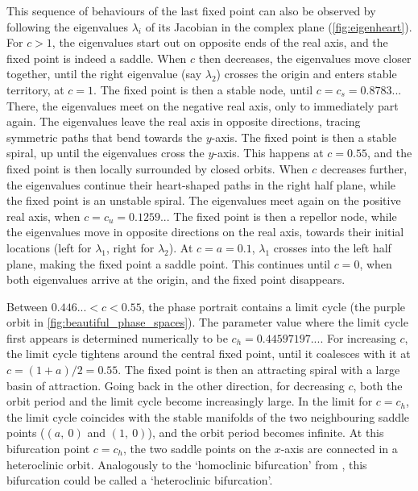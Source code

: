This sequence of behaviours of the last fixed point can also be observed by following the eigenvalues $\lambda_i$ of its Jacobian in the complex plane (\cref{fig:eigenheart}). For $c > 1$, the eigenvalues start out on opposite ends of the real axis, and the fixed point is indeed a saddle. When $c$ then decreases, the eigenvalues move closer together, until the right eigenvalue (say $\lambda_2$) crosses the origin and enters stable territory, at $c = 1$. The fixed point is then a stable node, until $c = c_s = 0.8783..$. There, the eigenvalues meet on the negative real axis, only to immediately part again. The eigenvalues leave the real axis in opposite directions, tracing symmetric paths that bend towards the $y$-axis. The fixed point is then a stable spiral, up until the eigenvalues cross the $y$-axis. This happens at $c = 0.55$, and the fixed point is then locally surrounded by closed orbits. When $c$ decreases further, the eigenvalues continue their heart-shaped paths in the right half plane, while the fixed point is an unstable spiral. The eigenvalues meet again on the positive real axis, when $c = c_u = 0.1259..$. The fixed point is then a repellor node, while the eigenvalues move in opposite directions on the real axis, towards their initial locations (left for $\lambda_1$, right for $\lambda_2$). At $c = a = 0.1$, $\lambda_1$ crosses into the left half plane, making the fixed point a saddle point. This continues until $c = 0$, when both eigenvalues arrive at the origin, and the fixed point disappears.

Between $0.446... < c < 0.55$, the phase portrait contains a limit cycle (the purple orbit in \cref{fig:beautiful_phase_spaces}). The parameter value where the limit cycle first appears is determined numerically to be $c_h =0.44597197...$. For increasing $c$, the limit cycle tightens around the central fixed point, until it coalesces with it at $c = (1+a)/2 = 0.55$. The fixed point is then an attracting spiral with a large basin of attraction. Going back in the other direction, for decreasing $c$, both the orbit period and the limit cycle become increasingly large. In the limit for $c = c_h$, the limit cycle coincides with the stable manifolds of the two neighbouring saddle points ($(a,\ 0)$ and $(1,\ 0)$), and the orbit period becomes infinite. At this bifurcation point $c = c_h$, the two saddle points on the $x$-axis are connected in a heteroclinic orbit. Analogously to the `homoclinic bifurcation' from , this bifurcation could be called a `heteroclinic bifurcation'.


